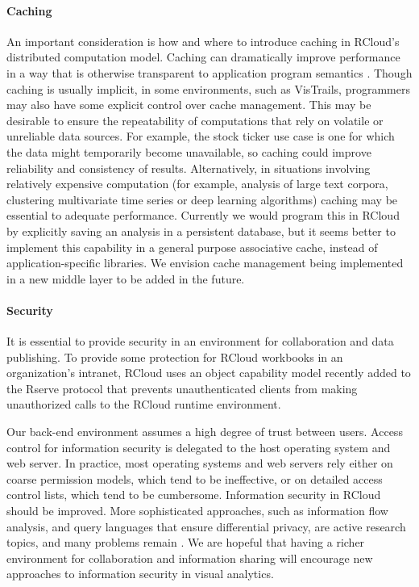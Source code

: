 \paragraph*{Caching}
An important consideration is how and where to introduce caching
in RCloud's distributed computation model. Caching can dramatically
improve performance in a way that is otherwise transparent to
application program semantics \cite{Callahan:2006:VVM, Guo:2010:TPI}.
Though caching is usually implicit, in some environments, such as
VisTrails, programmers may also have some explicit control over cache
management. This may be desirable to ensure the repeatability of
computations that rely on volatile or unreliable data sources.
For example, the stock ticker use case is one for which the data
might temporarily become unavailable, so caching could improve
reliability and consistency of results. Alternatively, in situations
involving relatively expensive computation (for example, analysis of large
text corpora, clustering multivariate time series or deep learning algorithms)
caching may be essential to adequate performance. Currently we would
program this in RCloud by explicitly saving an analysis in a persistent database,
but it seems better to implement this capability in a general purpose associative
cache, instead of application-specific libraries. We envision cache management
being implemented in a new middle layer to be added in the future.

\paragraph*{Security}
It is essential to provide security in an environment for
collaboration and data publishing. To provide some
protection for RCloud workbooks in an organization's intranet,
RCloud uses an object capability model
\cite{Miller:2006:RCT}
recently added to the Rserve protocol \cite{Urbanek:2003:AFW}
that prevents unauthenticated clients from making
unauthorized calls to the RCloud runtime environment.

Our back-end environment assumes a high degree of trust between users.
Access control for information security is delegated to the host
operating system and web server. In practice, most operating
systems and web servers rely either on coarse permission models,
which tend to be ineffective, or on detailed access control
lists, which tend to be cumbersome.
Information security in RCloud should be improved. More
sophisticated approaches, such as information flow analysis,
and query languages that ensure differential privacy, are
active research topics, and many problems remain
\cite{Moore:2011:SAF}. We are hopeful that having a richer
environment for collaboration and information sharing will encourage
new approaches to information security in visual analytics.

